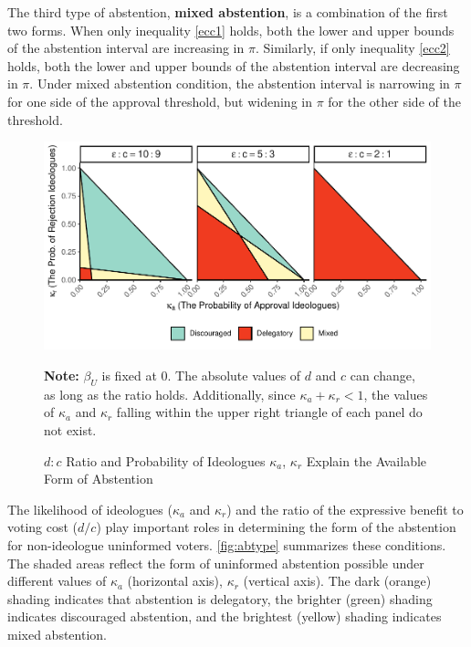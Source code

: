\documentclass[letterpaper, 12pt]{article}
\newcommand{\floatnote}[1]{\vspace{\abovecaptionskip}\caption*{\textbf{Note:} #1}\vspace{-\abovecaptionskip}}
\begin{document}
    \par The third type of abstention, \textbf{mixed abstention}, is a combination of the first two forms. When only inequality \ref{ecc1} holds, both the lower and upper bounds of the abstention interval are increasing in $\pi$. Similarly, if only inequality \ref{ecc2} holds, both the lower and upper bounds of the abstention interval are decreasing in $\pi$. Under mixed abstention condition, the abstention interval is narrowing in $\pi$ for one side of the approval threshold, but widening in $\pi$ for the other side of the threshold.  
        
    \begin{figure}[t!]
        \caption{$d:c$ Ratio and Probability of Ideologues $\kappa_a$, $\kappa_r$ Explain the Available Form of Abstention}
        \label{fig:abtype}
        \includegraphics[width=\linewidth]{figure/abtype-1}
        \floatnote{$\beta_U$ is fixed at $0$. The absolute values of $d$ and $c$ can change, as long as the ratio holds. Additionally, since $\kappa_a + \kappa_r < 1$, the values of $\kappa_a$ and $\kappa_r$ falling within the upper right triangle of each panel do not exist.}
    \end{figure}
    
    \par The likelihood of ideologues ($\kappa_{a}$ and $\kappa_{r}$) and the ratio of the expressive benefit to voting cost ($d/c$) play important roles in determining the form of the abstention for non-ideologue uninformed voters. \autoref{fig:abtype} summarizes these conditions. The shaded areas reflect the form of uninformed abstention possible under different values of $\kappa_a$ (horizontal axis), $\kappa_r$ (vertical axis). The dark (orange) shading indicates that abstention is delegatory, the brighter (green) shading indicates discouraged abstention, and the brightest (yellow) shading indicates mixed abstention. 
    
\end{document}
